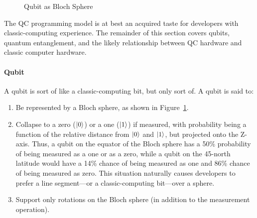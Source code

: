 \begin{figure}[tb]
\centering
{}
\caption{Qubit as Bloch Sphere}
\label{fig:future:Qubit as Bloch Sphere}
\end{figure}

The QC programming model is at best an acquired taste for developers
with classic-computing experience.
The remainder of this section covers qubits,
quantum entanglement,
and
the likely relationship between QC hardware and classic computer hardware.

\paragraph{Qubit}

A qubit is sort of like a classic-computing bit, but only sort of.
A qubit is said to:

\begin{enumerate}
\item	Be represented by a Bloch sphere, as shown in
	Figure~\ref{fig:future:Qubit as Bloch Sphere}.
\item	Collapse to a zero ($\ket{0}$) or a one ($\ket{1}$) if measured,
	with probability being a function of the relative distance from
	$\ket{0}$ and $\ket{1}$, but projected onto the Z-axis.
	Thus, a qubit on the equator of the Bloch sphere has a 50\%
	probability of being measured as a one or as a zero, while
	a qubit on the 45\textdegree-north latitude would have
	a 14\% chance of being measured as one and 86\% chance
	of being measured as zero.
	This situation naturally causes developers to prefer a line
	segment---or a classic-computing bit---over a sphere.
\item	Support only rotations on the Bloch sphere (in addition to
	the measurement operation).
\end{enumerate}

